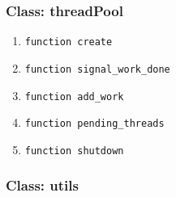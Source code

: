 \subsubsection{Class: threadPool}
\begin{enumerate}
    \item \verb|function create|
    \item \verb|function signal_work_done|
    \item \verb|function add_work|
    \item \verb|function pending_threads|
    \item \verb|function shutdown|
\end{enumerate}
\subsubsection{Class: utils}
